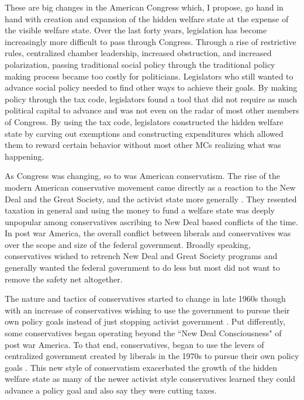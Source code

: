 \documentclass[12pt]{article}
\begin{document}
These are big changes in the American Congress which, I propose, go hand in hand with creation and expansion of the hidden welfare state at the expense of the visible welfare state. Over the last forty years, legislation has become increasingly more difficult to pass through Congress. Through a rise of restrictive rules, centralized chamber leadership, increased obstruction, and increased polarization, passing traditional social policy through the traditional policy making process became too costly for politicians. Legislators who still wanted to advance social policy needed to find other ways to achieve their goals. By making policy through the tax code, legislators found a tool that did not require as much political capital to advance and was not even on the radar of most other members of Congress. By using the tax code, legislators constructed the hidden welfare state by carving out exemptions and constructing expenditures which allowed them to reward certain behavior without most other MCs realizing what was happening. 

As Congress was changing, so to was American conservatism. The rise of the modern American conservative movement came directly as a reaction to the New Deal and the Great Society, and the activist state more generally \citep{critchlow2007, zelizer2010}. They resented taxation in general and using the money to fund a welfare state was deeply unpopular among conservatives ascribing to New Deal based conflicts of the time. In post war America, the overall conflict between liberals and conservatives was over the scope and size of the federal government. Broadly speaking, conservatives wished to retrench New Deal and Great Society programs and generally wanted the federal government to do less but most did not want to remove the safety net altogether. 

The nature and tactics of conservatives started to change in late 1960s though with an increase of conservatives wishing to use the government to pursue their own policy goals instead of just stopping activist government \citep{teles2007, skocpol2007}. Put differently, some conservatives began operating beyond the ``New Deal Consciousness" of post war America. To that end, conservatives, began to use the levers of centralized government created by liberals in the 1970s to pursue their own policy goals \citep{hacker2004}. This new style of conservatism exacerbated the growth of the hidden welfare state as many of the newer activist style conservatives learned they could advance a policy goal and also say they were cutting taxes. 
\end{document}
